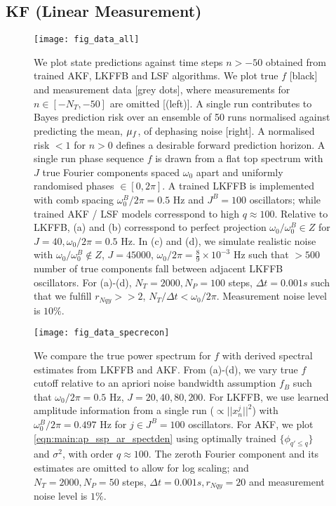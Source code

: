 \subsection{KF (Linear Measurement)}

\begin{figure}
    \texttt{[image: fig\_data\_all]}
    \caption{\label{fig:main:fig_data_all} We plot state predictions against time steps $n > -50$ obtained from trained AKF, LKFFB and LSF algorithms. We plot true $f$ [black] and measurement data [grey dots], where measurements for $n \in [-N_T, -50]$ are omitted [(left)]. A single run contributes to Bayes prediction risk over an ensemble of 50 runs normalised against predicting the mean, $\mu_f$, of dephasing noise [right]. A normalised risk $<1$ for $n > 0$ defines a desirable forward prediction horizon. A single run phase sequence $f$ is drawn from a flat top spectrum with $J$ true Fourier components spaced $\omega_0$ apart and uniformly randomised phases $\in [0, 2\pi]$. A trained LKFFB is implemented with comb spacing $\omega_0^B / 2\pi = 0.5$ Hz and $J^B =100$ oscillators; while trained AKF / LSF models corresspond to high $q \approx 100$. Relative to LKFFB,  (a) and (b) corresspond to perfect projection $\omega_0 / \omega_0^B  \in Z $ for $J= 40, \omega_0 / 2\pi = 0.5$ Hz. In (c) and (d), we simulate realistic noise with $\omega_0 / \omega_0^B  \notin Z$, $J = 45000$, $\omega_0 / 2\pi = \frac{8}{9} \times 10^{-3}$ Hz such that $>500$ number of true components fall between adjacent LKFFB oscillators. For (a)-(d), $N_T = 2000, N_P = 100$ steps, $\Delta t = 0.001s$ such that we fulfill $r_{Nqy} >> 2$, $N_T / \Delta t < \omega_0/2\pi$. Measurement noise level is $10\%$.}
\end{figure} 

\begin{figure}
    \texttt{[image: fig\_data\_specrecon]}
    \caption{\label{fig:main:fig_data_specrecon} We compare the true power spectrum for $f$ with derived spectral estimates from LKFFB and AKF. From (a)-(d), we vary true $f$ cutoff relative to an apriori noise bandwidth assumption $f_B$ such that $\omega_0 / 2\pi = 0.5$ Hz, $J = 20, 40, 80, 200$. For LKFFB, we use learned amplitude information from a single run ($\propto ||x^j_n||^2 $) with $\omega_0^B / 2\pi = 0.497$ Hz for $j \in J^B = 100$ oscillators. For AKF, we plot \cref{eqn:main:ap_ssp_ar_spectden} using optimally trained $\{\phi_{q' \leq q}\}$ and $\sigma^2$, with order $q \approx 100$. The zeroth Fourier component and its estimates are omitted to allow for log scaling; and $N_T = 2000, N_P = 50$ steps, $\Delta t = 0.001s, r_{Nqy}=20$ and measurement noise level is $1\%$.} 
\end{figure} 

